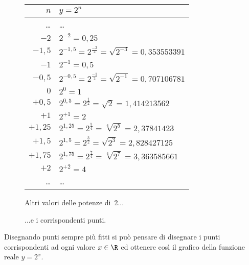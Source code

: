 \begin{figure}[h]
 \centering
 \begin{minipage}[]{.48\textwidth}
  \begin{center}
   \begin{tabular}{r|l}
    $n$   & $y=2^n$ \\
    \hline
    \dots & \dots \\
    $-2$ & $2^{-2} = 0,25$ \\
    $-1,5$ & $2^{-1,5} = 2^{\frac{-3}{2}} = \sqrt{2^{-3}} = 0,353553391$ \\
    $-1$ & $2^{-1} = 0,5$ \\
    $-0,5$ & $2^{-0,5} = 2^{\frac{-1}{2}} = \sqrt{2^{-1}} = 0,707106781$ \\
    $0$ & $2^{0} = 1$ \\
    $+0,5$ & $2^{0,5} = 2^{\frac{1}{2}} = \sqrt{2} = 1,414213562$ \\
    $+1$ & $2^{+1} = 2$ \\
    $+1,25$ & $2^{1,25} = 2^{\frac{5}{4}} = \sqrt[4]{2^{5}} = 2,37841423$ \\
    $+1,5$ & $2^{1,5} = 2^{\frac{3}{2}} = \sqrt{2^{3}} = 2,828427125$ \\
    $+1,75$ & $2^{1,75} = 2^{\frac{7}{4}} = \sqrt[4]{2^{7}} = 3,363585661$ \\
    $+2$ & $2^{+2} = 4$ \\
    \dots & \dots \\
   \end{tabular}
  \caption{Altri valori delle potenze di~2...} \label{tab:potdue1}
  \end{center}
 \end{minipage}
\begin{minipage}[]{.48\textwidth}
\begin{center}
\begin{inaccessibleblock}
  \vspace*{.8cm}
  \puntib
  \vspace*{.65cm}
  \caption{...e i corrispondenti punti.} \label{fig:potdue1}
\end{inaccessibleblock}
\end{center}
\end{minipage}
\end{figure}

Disegnando punti sempre più fitti si può pensare di disegnare i punti 
corrispondenti ad ogni valore \(x \in \R\) ed ottenere così il grafico della 
funzione reale \(y=2^x\).

